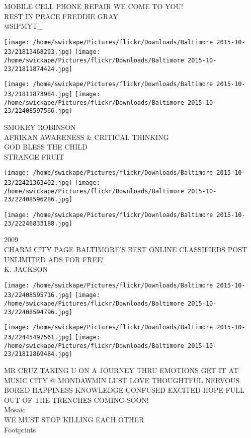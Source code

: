 \documentclass[10pt,letterpaper]{article}
\begin{document}
MOBILE CELL PHONE REPAIR WE COME TO YOU!\\
REST IN PEACE FREDDIE GRAY\\
@SIPMYT\_\\
\pagebreak

\texttt{[image: /home/swickape/Pictures/flickr/Downloads/Baltimore 2015-10-23/21813468293.jpg]}
\texttt{[image: /home/swickape/Pictures/flickr/Downloads/Baltimore 2015-10-23/21811874424.jpg]}

\texttt{[image: /home/swickape/Pictures/flickr/Downloads/Baltimore 2015-10-23/21811873984.jpg]}
\texttt{[image: /home/swickape/Pictures/flickr/Downloads/Baltimore 2015-10-23/22408597566.jpg]}

SMOKEY ROBINSON\\
AFRIKAN AWARENESS \& CRITICAL THINKING\\
GOD BLESS THE CHILD\\
STRANGE FRUIT\\
\pagebreak

\texttt{[image: /home/swickape/Pictures/flickr/Downloads/Baltimore 2015-10-23/22421363402.jpg]}
\texttt{[image: /home/swickape/Pictures/flickr/Downloads/Baltimore 2015-10-23/22408596286.jpg]}

\vspace{0.25in}
\texttt{[image: /home/swickape/Pictures/flickr/Downloads/Baltimore 2015-10-23/22246833188.jpg]}

2009\\
CHARM CITY PAGE BALTIMORE'S BEST ONLINE CLASSIFIEDS POST UNLIMITED ADS FOR FREE!\\
K. JACKSON\\
\pagebreak

\texttt{[image: /home/swickape/Pictures/flickr/Downloads/Baltimore 2015-10-23/22408595716.jpg]}
\texttt{[image: /home/swickape/Pictures/flickr/Downloads/Baltimore 2015-10-23/22408594796.jpg]}

\texttt{[image: /home/swickape/Pictures/flickr/Downloads/Baltimore 2015-10-23/22445497561.jpg]}
\texttt{[image: /home/swickape/Pictures/flickr/Downloads/Baltimore 2015-10-23/21811869484.jpg]}

MR CRUZ TAKING U ON A JOURNEY THRU EMOTIONS GET IT AT MUSIC CITY @ MONDAWMIN LUST LOVE THOUGHTFUL NERVOUS BORED HAPPINESS KNOWLEDGE CONFUSED EXCITED HOPE FULL OUT OF THE TRENCHES COMING SOON!\\
Mosaic\\
WE MUST STOP KILLING EACH OTHER\\
Footprints\\
\pagebreak
\end{document}
